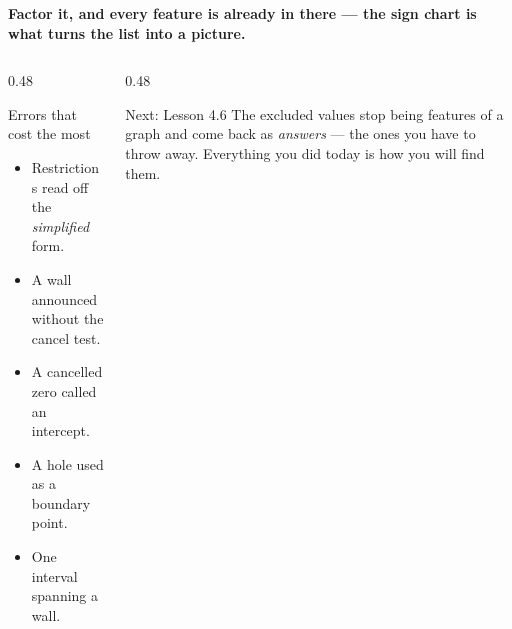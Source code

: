\documentclass[aspectratio=169, 11pt]{beamer}
\begin{document}
\begin{frame}[t, plain]
  \begin{block}{}
    \centering\textbf{Factor it, and every feature is already in there --- the sign chart is what turns
    the list into a picture.}
  \end{block}
  \vspace{6pt}
  \begin{columns}[T]
    \begin{column}{0.48\textwidth}
      \begin{block}{Errors that cost the most}
        \begin{itemize}\setlength{\itemsep}{2pt}
          \item Restrictions read off the \emph{simplified} form.
          \item A wall announced without the cancel test.
          \item A cancelled zero called an intercept.
          \item A hole used as a boundary point.
          \item One interval spanning a wall.
        \end{itemize}
      \end{block}
    \end{column}
    \begin{column}{0.48\textwidth}
      \begin{block}{Next: Lesson 4.6}
        The excluded values stop being features of a graph and come back as \emph{answers} --- the ones
        you have to throw away. Everything you did today is how you will find them.
      \end{block}
    \end{column}
  \end{columns}
\end{frame}
\end{document}

